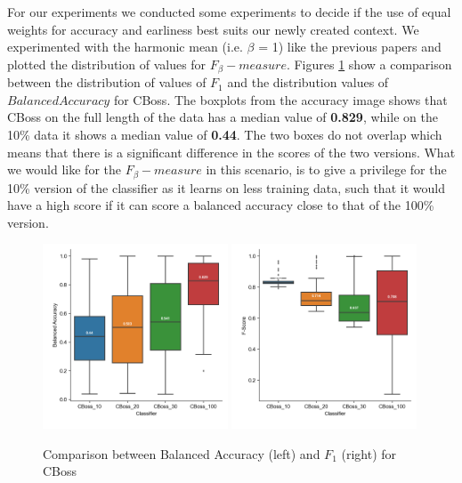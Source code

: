 For our experiments we conducted some experiments to decide if the use of equal weights for accuracy and earliness best suits our newly created context.
We experimented with the harmonic mean (i.e. $\beta$ = 1) like the previous papers and plotted the distribution of values for $F_{\beta}-measure$.
Figures \ref{fig:FBeta1} show a comparison between the distribution of values of $F_{1}$ and the distribution values of $Balanced Accuracy$ for CBoss.
The boxplots from the accuracy image shows that CBoss on the full length of the data has a median value of \textbf{0.829}, while on the 10\% data it shows a median value of \textbf{0.44}.
The two boxes do not overlap which means that there is a significant difference in the scores of the two versions.
What we would like for the $F_{\beta}-measure$ in this scenario, is to give a privilege for the 10\% version of the classifier as it learns on less training data, such that it would have
a high score if it can score a balanced accuracy close to that of the 100\% version.


\begin{figure}[!htbp]
  \captionsetup{justification=raggedright}
  \includegraphics[width=0.49\textwidth,keepaspectratio]{boxplot_accuracy_CBoss.png}
  \includegraphics[width=0.49\textwidth,keepaspectratio]{boxplot_f_score_1_CBoss.png}
  \caption{Comparison between Balanced Accuracy (left) and $F_{1}$ (right) for CBoss}
  \label{fig:FBeta1}
\end{figure}

